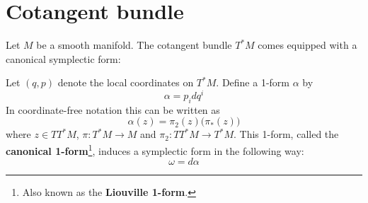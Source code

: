 \section{Cotangent bundle}

	\begin{construct}
		Let $M$ be a smooth manifold. The cotangent bundle $T^*M$ comes equipped with a canonical symplectic form:
		
		Let $(q, p)$ denote the local coordinates on $T^*M$. Define a 1-form $\alpha$ by \[\alpha = p_idq^i\] In coordinate-free notation this can be written as
		\begin{equation}
			\alpha(z) = \pi_2(z)\Big(\pi_*(z)\Big)
		\end{equation}
		where $z\in TT^*M$, $\pi: T^*M\rightarrow M$ and $\pi_2:TT^*M\rightarrow T^*M$. This 1-form, called the \textbf{canonical 1-form}\footnote{Also known as the \textbf{Liouville 1-form}.}, induces a symplectic form in the following way: \[\omega = d\alpha\]
	\end{construct}
